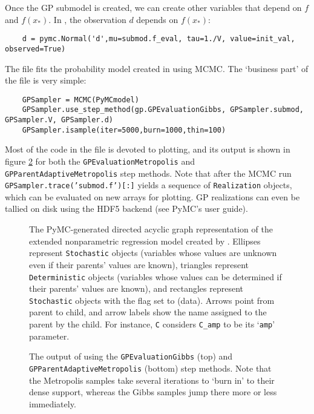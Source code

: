 Once the GP submodel is created, we can create other variables that depend on $f$ and $f(x_*)$. In , the observation $d$ depends on $f(x_*)$: 
\begin{verbatim}
    d = pymc.Normal('d',mu=submod.f_eval, tau=1./V, value=init_val, observed=True)
\end{verbatim}

The file  fits the probability model created in  using MCMC. The `business part' of the file is very simple:
\begin{verbatim}
    GPSampler = MCMC(PyMCmodel)
    GPSampler.use_step_method(gp.GPEvaluationGibbs, GPSampler.submod, GPSampler.V, GPSampler.d)
    GPSampler.isample(iter=5000,burn=1000,thin=100)
\end{verbatim}
Most of the code in the file is devoted to plotting, and its output is shown in figure \ref{fig:MCMCOutput} for both the \texttt{GPEvaluationMetropolis} and \texttt{GPParentAdaptiveMetropolis} step methods. Note that after the MCMC run \texttt{GPSampler.trace('submod.f')[:]} yields a sequence of \texttt{Realization} objects, which can be evaluated on new arrays for plotting. GP realizations can even be tallied on disk using the HDF5 backend (see PyMC's user guide).

\begin{figure}
    \centering
    \caption{The PyMC-generated directed acyclic graph representation of the extended nonparametric regression model created by  . Ellipses represent \texttt{Stochastic} objects (variables whose values are unknown even if their parents' values are known), triangles represent \texttt{Deterministic} objects (variables whose values can be determined if their parents' values are known), and rectangles represent \texttt{Stochastic} objects with the  flag set to  (data). Arrows point from parent to child, and arrow labels show the name assigned to the parent by the child. For instance, \texttt{C} considers \texttt{C\_amp} to be its `\texttt{amp}' parameter.}
    \label{fig:unobservedModel}
\end{figure}

\begin{figure}
    \centering
    \caption{The output of  using the \texttt{GPEvaluationGibbs} (top) and \texttt{GPParentAdaptiveMetropolis} (bottom) step methods. Note that the Metropolis samples take several iterations to `burn in' to their dense support, whereas the Gibbs samples jump there more or less immediately.}
    \label{fig:MCMCOutput}
\end{figure}

